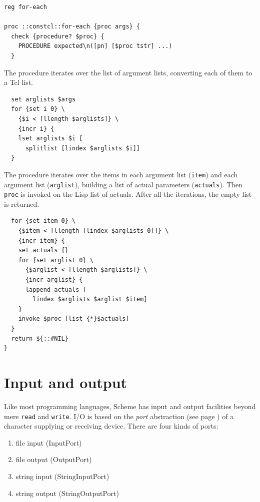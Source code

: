\documentclass[twoside]{report}
\begin{document}
\begin{lstlisting}
reg for-each

proc ::constcl::for-each {proc args} {
  check {procedure? $proc} {
    PROCEDURE expected\n([pn] [$proc tstr] ...)
  }
\end{lstlisting}

The procedure iterates over the list of argument lists, converting each of them to a Tcl list.

\begin{lstlisting}
  set arglists $args
  for {set i 0} \
    {$i < [llength $arglists]} \
    {incr i} {
    lset arglists $i [
      splitlist [lindex $arglists $i]]
  }
\end{lstlisting}

The procedure iterates over the items in each argument list (\texttt{item}) and each argument list (\texttt{arglist}), building a list of actual parameters (\texttt{actuals}). Then \texttt{proc} is invoked on the Lisp list of actuals. After all the iterations, the empty list is returned.

\begin{lstlisting}
  for {set item 0} \
    {$item < [llength [lindex $arglists 0]]} \
    {incr item} {
    set actuals {}
    for {set arglist 0} \
      {$arglist < [llength $arglists]} \
      {incr arglist} {
      lappend actuals [
        lindex $arglists $arglist $item]
    }
    invoke $proc [list {*}$actuals]
  }
  return ${::#NIL}
}
\end{lstlisting}

\section{Input and output}
\label{input-and-output}

Like most programming languages, Scheme has input and output facilities beyond mere \texttt{read} and \texttt{write}. I/O is based on the \emph{port} abstraction (see page \pageref{ports}) of a character supplying or receiving device. There are four kinds of ports:

\begin{enumerate}
\item file input (InputPort)
\item file output (OutputPort)
\item string input (StringInputPort)
\item string output (StringOutputPort)
\end{enumerate}
\end{document}

